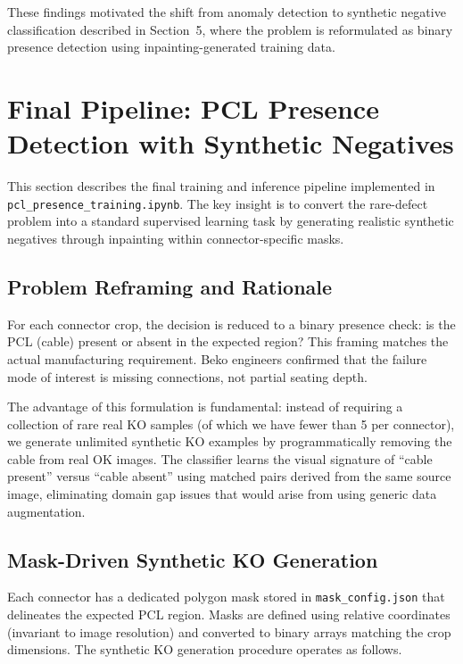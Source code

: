 \documentclass[11pt,a4paper,draft]{article}
\begin{document}
These findings motivated the shift from anomaly detection to synthetic negative classification described in Section~5, where the problem is reformulated as binary presence detection using inpainting-generated training data.

\section{Final Pipeline: PCL Presence Detection with Synthetic Negatives}

This section describes the final training and inference pipeline implemented in \texttt{pcl\_presence\_training.ipynb}. The key insight is to convert the rare-defect problem into a standard supervised learning task by generating realistic synthetic negatives through inpainting within connector-specific masks.

\subsection{Problem Reframing and Rationale}

For each connector crop, the decision is reduced to a binary presence check: is the PCL (cable) present or absent in the expected region? This framing matches the actual manufacturing requirement. Beko engineers confirmed that the failure mode of interest is missing connections, not partial seating depth. 

The advantage of this formulation is fundamental: instead of requiring a collection of rare real KO samples (of which we have fewer than 5 per connector), we generate unlimited synthetic KO examples by programmatically removing the cable from real OK images. The classifier learns the visual signature of ``cable present'' versus ``cable absent'' using matched pairs derived from the same source image, eliminating domain gap issues that would arise from using generic data augmentation.

\subsection{Mask-Driven Synthetic KO Generation}

Each connector has a dedicated polygon mask stored in \texttt{mask\_config.json} that delineates the expected PCL region. Masks are defined using relative coordinates (invariant to image resolution) and converted to binary arrays matching the crop dimensions. The synthetic KO generation procedure operates as follows.
\end{document}
